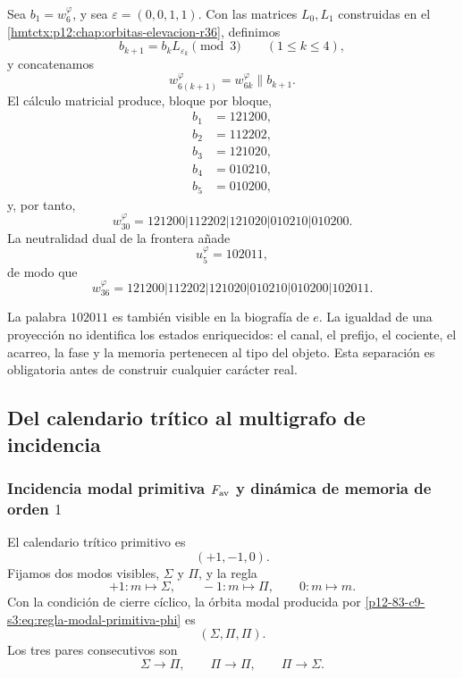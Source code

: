 Sea \(b_1=w_6^{\varphi}\), y sea
\(\varepsilon=(0,0,1,1)\). Con las matrices \(L_0,L_1\) construidas en el
\cref{hmtctx:p12:chap:orbitas-elevacion-r36}, definimos
\[
 b_{k+1}=b_kL_{\varepsilon_k}\pmod3
 \qquad(1\leq k\leq4),
\]
y concatenamos
\[
 w_{6(k+1)}^{\varphi}=w_{6k}^{\varphi}\mathbin{\|}b_{k+1}.
\]
El cálculo matricial produce, bloque por bloque,
\[
\begin{aligned}
 b_1&=121200,\\
 b_2&=112202,\\
 b_3&=121020,\\
 b_4&=010210,\\
 b_5&=010200,
\end{aligned}
\]
y, por tanto,
\begin{equation}
 \boxed{
 w_{30}^{\varphi}
 =121200|112202|121020|010210|010200.}
 \label{p12-83-c9-s3:eq:w30-phi}
\end{equation}
La neutralidad dual de la frontera añade
\[
 u_5^{\varphi}=102011,
\]
de modo que
\begin{equation}
 \boxed{
 w_{36}^{\varphi}
 =121200|112202|121020|010210|010200|102011.}
 \label{p12-83-c9-s3:eq:w36-phi}
\end{equation}

\begin{remark}
La palabra \(102011\) es también visible en la biografía de \(e\). La
igualdad de una proyección no identifica los estados enriquecidos: el canal,
el prefijo, el cociente, el acarreo, la fase y la memoria pertenecen al tipo
del objeto. Esta separación es obligatoria antes de construir cualquier
carácter real.
\end{remark}

\subsection{Del calendario trítico al multigrafo de incidencia}

\subsubsection{Incidencia modal primitiva \(F_{\rm av}\) y dinámica de memoria de orden \(1\)}

El calendario trítico primitivo es
\[
 (+1,-1,0).
\]
Fijamos dos modos visibles, \(\Sigma\) y \(\Pi\), y la regla
\begin{equation}
 +1:m\longmapsto\Sigma,
 \qquad
 -1:m\longmapsto\Pi,
 \qquad
 0:m\longmapsto m.
 \label{p12-83-c9-s3:eq:regla-modal-primitiva-phi}
\end{equation}
Con la condición de cierre cíclico, la órbita modal producida por
\eqref{p12-83-c9-s3:eq:regla-modal-primitiva-phi} es
\[
 \boxed{(\Sigma,\Pi,\Pi).}
\]
Los tres pares consecutivos son
\[
 \Sigma\longrightarrow\Pi,
 \qquad
 \Pi\longrightarrow\Pi,
 \qquad
 \Pi\longrightarrow\Sigma.
\]

